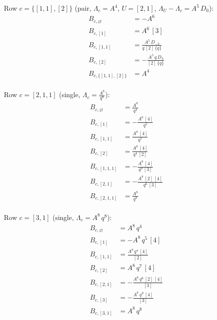 \documentclass[11pt]{article}
\begin{document}
\noindent Row $c = \{[1,1],[2]\}$ (pair, $\Lambda_c = A^{4}$, $U = [2,1]$, $\Lambda_U - \Lambda_c = A^{5}\,D_{0}$):
\begin{align*}
B_{c,\varnothing} &= -A^{6} \\
B_{c,[1]} &= A^{6}\,[3] \\
B_{c,[1,1]} &= \frac{A^{5}\,D_{-3}}{q\,[2]\,\{q\}} \\
B_{c,[2]} &= -\frac{A^{5}\,q\,D_{3}}{[2]\,\{q\}} \\
B_{c,\{[1,1],[2]\}} &= A^{4} \\
\end{align*}

\noindent Row $c = [2,1,1]$ (single, $\Lambda_c = \frac{A^{8}}{q^{8}}$):
\begin{align*}
B_{c,\varnothing} &= \frac{A^{8}}{q^{4}} \\
B_{c,[1]} &= -\frac{A^{8}\,[4]}{q^{5}} \\
B_{c,[1,1]} &= \frac{A^{8}\,[4]}{q^{7}} \\
B_{c,[2]} &= \frac{A^{8}\,[4]}{q^{4}\,[2]} \\
B_{c,[1,1,1]} &= -\frac{A^{8}\,[4]}{q^{9}\,[3]} \\
B_{c,[2,1]} &= -\frac{A^{8}\,[2]\,[4]}{q^{6}\,[3]} \\
B_{c,[2,1,1]} &= \frac{A^{8}}{q^{8}} \\
\end{align*}

\noindent Row $c = [3,1]$ (single, $\Lambda_c = A^{8}\,q^{8}$):
\begin{align*}
B_{c,\varnothing} &= A^{8}\,q^{4} \\
B_{c,[1]} &= -A^{8}\,q^{5}\,[4] \\
B_{c,[1,1]} &= \frac{A^{8}\,q^{4}\,[4]}{[2]} \\
B_{c,[2]} &= A^{8}\,q^{7}\,[4] \\
B_{c,[2,1]} &= -\frac{A^{8}\,q^{6}\,[2]\,[4]}{[3]} \\
B_{c,[3]} &= -\frac{A^{8}\,q^{9}\,[4]}{[3]} \\
B_{c,[3,1]} &= A^{8}\,q^{8} \\
\end{align*}
\end{document}
